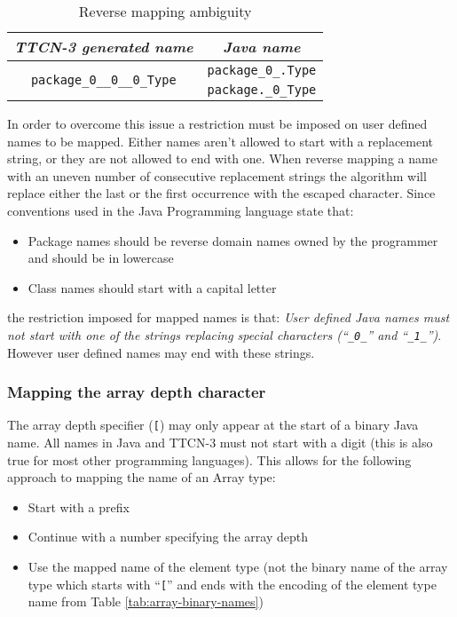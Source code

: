 \begin{table}[htb]
\centering
\begin{tabular}{|c || c|}
	\hline
	\emph{\ac{TTCN-3} generated name} & \emph{Java name} \\
	\hline
	\multirow{2}{*}{\texttt{package\_0\_\_0\_\_0\_Type}} &
		\verb=package_0_.Type= \\
	& \verb=package._0_Type= \\
	\hline
\end{tabular}
\caption{Reverse mapping ambiguity\label{tab:mapping-ambiguity}}
\end{table}

In order to overcome this issue a restriction must be imposed
on user defined names to be mapped.
Either names aren't allowed to start with a replacement string,
or they are not allowed to end with one.
When reverse mapping a name with an uneven number of
consecutive replacement strings
the algorithm will replace either the last or the first occurrence
with the escaped character.
Since conventions used in the Java Programming language state that:
\begin{itemize}
\item Package names should be reverse domain names owned by the programmer
and should be in lowercase
\item Class names should start with a capital letter
\end{itemize}
the restriction imposed for mapped names is that:
\emph{User defined Java names must not start with one of the strings
replacing special characters (``\texttt{\_0\_}'' and ``\texttt{\_1\_}'')}.
However user defined names may end with these strings.


\subsubsection{Mapping the array depth character}

The array depth specifier (\verb=[=) may only appear at the start
of a binary Java name.
All names in Java and \ac{TTCN-3} must not start with a digit
(this is also true for most other programming languages).
This allows for the following approach to mapping the name of an Array type:
\begin{itemize}
\item Start with a prefix
\item Continue with a number specifying the array depth
\item Use the mapped name of the element type
(not the binary name of the array type
which starts with ``\verb=[='' and ends with
the encoding of the element type name from Table \ref{tab:array-binary-names})
\end{itemize}

